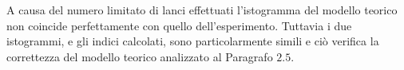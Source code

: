 A causa del numero limitato di lanci effettuati l'istogramma del modello teorico non coincide perfettamente con quello dell'esperimento. Tuttavia i due istogrammi, e gli indici calcolati, sono particolarmente simili e ciò verifica la correttezza del modello teorico analizzato al Paragrafo $2.5$.